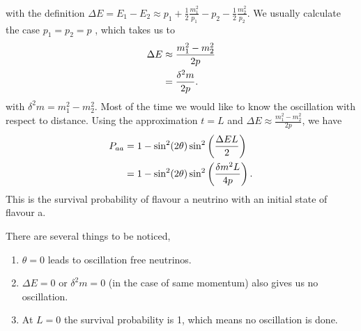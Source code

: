 \documentclass[letterpaper,12pt,english]{sphinxmanual}
\begin{document}
with the definition \(\Delta E =  E_1-E_2 \approx p_1 + \frac{1}{2}\frac{m_1^2}{p_1} - p_2 - \frac{1}{2}\frac{m_2^2}{p_2}\). We usually calculate the case \(p_1=p_2=p\) , which takes us to
\begin{gather}
\begin{split}\Delta E & \approx \frac{m_1^2 - m_2^2}{2p} \\
& = \frac{\delta^2 m}{2p} .\end{split}\notag
\end{gather}
with \(\delta^2 m=m_1^2 - m_2^2\). Most of the time we would like to know the oscillation with respect to distance. Using the approximation \(t = L\) and \(\Delta E \approx \frac{m_1^2 - m_2^2}{2p}\), we have
\begin{gather}
\begin{split}P_{aa} &= 1 - \sin^2(2\theta) \sin^2\left( \frac{\Delta E L}{2} \right) \\
& = 1 -  \sin^2(2\theta) \sin^2\left( \frac{ \delta m^2  L}{4p} \right) .\end{split}\notag
\end{gather}
This is the survival probability of flavour a neutrino with an initial state of flavour a.

There are several things to be noticed,
\begin{enumerate}
\item {} 
\(\theta=0\) leads to oscillation free neutrinos.

\item {} 
\(\Delta E=0\) or \(\delta ^2m =0\) (in the case of same momentum) also gives us no oscillation.

\item {} 
At \(L=0\) the survival probability is 1, which means no oscillation is done.

\end{enumerate}
\end{document}

